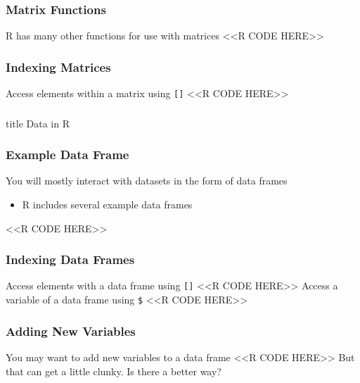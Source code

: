 \documentclass{beamer}
\begin{document}
\begin{frame}[fragile]\frametitle{Matrix Functions}
    R has many other functions for use with matrices
    <<R CODE HERE>>
\end{frame}

\begin{frame}[fragile]\frametitle{Indexing Matrices}
    Access elements within a matrix using \texttt{[]}
    <<R CODE HERE>>
\end{frame}

\begin{frame}\frametitle{}
    \vfill
    \centering
    \begin{beamercolorbox}[center]{title}
        \Large Data in R
    \end{beamercolorbox}
    \vfill
\end{frame}

\begin{frame}[fragile]\frametitle{Example Data Frame}
    You will mostly interact with datasets in the form of data frames
    \begin{itemize}
        \item R includes several example data frames
    \end{itemize}
    <<R CODE HERE>>
\end{frame}

\begin{frame}[fragile]\frametitle{Indexing Data Frames}
    Access elements with a data frame using \texttt{[]}
    <<R CODE HERE>>
    \vspace{2ex}
    Access a variable of a data frame using \texttt{\$}
    <<R CODE HERE>>
\end{frame}

\begin{frame}[fragile]\frametitle{Adding New Variables}
    You may want to add new variables to a data frame
    <<R CODE HERE>>
    But that can get a little clunky. Is there a better way?
\end{frame}
\end{document}
